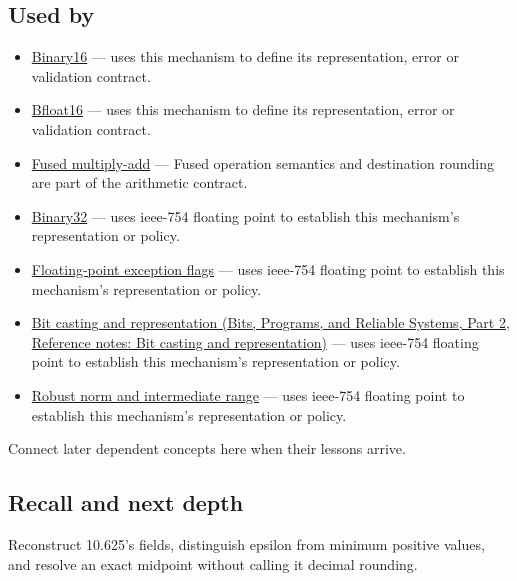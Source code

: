 \subsection{Used by}\label{appendix-343615f49ddf-used-by}

\hypertarget{appendix-343615f49ddf-used-by}{}

\begin{itemize}
\item
  \hyperref[appendix-34443cec7170]{Binary16} --- uses this mechanism to define its representation, error or validation contract.
\item
  \hyperref[appendix-18b8dd966b5d]{Bfloat16} --- uses this mechanism to define its representation, error or validation contract.
\item
  \hyperref[appendix-41e8ef22a21e]{Fused multiply-add} --- Fused operation semantics and destination rounding are part of the arithmetic contract.
\item
  \hyperref[appendix-5057f9ad327f]{Binary32} --- uses ieee-754 floating point to establish this mechanism's representation or policy.
\item
  \hyperref[appendix-ed8531b46754]{Floating-point exception flags} --- uses ieee-754 floating point to establish this mechanism's representation or policy.
\item
  \href{../01-Bits-Programs-and-Reliable-Systems-P02/main.pdf\#appendix-34ee45f161c1}{Bit casting and representation (Bits, Programs, and Reliable Systems, Part 2, Reference notes: Bit casting and representation)} --- uses ieee-754 floating point to establish this mechanism's representation or policy.
\item
  \hyperref[appendix-7f1e17dcafb1]{Robust norm and intermediate range} --- uses ieee-754 floating point to establish this mechanism's representation or policy.
\end{itemize}

Connect later dependent concepts here when their lessons arrive.

\subsection{Recall and next depth}\label{appendix-343615f49ddf-recall-and-next-depth}

\hypertarget{appendix-343615f49ddf-recall-and-next-depth}{}

Reconstruct 10.625's fields, distinguish epsilon from minimum positive values, and resolve an exact midpoint without calling it decimal rounding.

